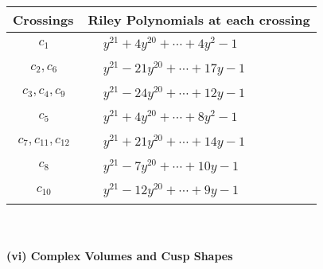\documentclass[1p]{elsarticle_modified}
\theoremstyle{definition}
\begin{document}
\begin{tabular}{m{50pt}|m{274pt}}
Crossings & \hspace{64pt}Riley Polynomials at each crossing \\
\hline $$\begin{aligned}c_{1}\end{aligned}$$&$\begin{aligned}
&y^{21}+4 y^{20}+\cdots+4 y^2-1
\end{aligned}$\\
\hline $$\begin{aligned}c_{2},c_{6}\end{aligned}$$&$\begin{aligned}
&y^{21}-21 y^{20}+\cdots+17 y-1
\end{aligned}$\\
\hline $$\begin{aligned}c_{3},c_{4},c_{9}\end{aligned}$$&$\begin{aligned}
&y^{21}-24 y^{20}+\cdots+12 y-1
\end{aligned}$\\
\hline $$\begin{aligned}c_{5}\end{aligned}$$&$\begin{aligned}
&y^{21}+4 y^{20}+\cdots+8 y^2-1
\end{aligned}$\\
\hline $$\begin{aligned}c_{7},c_{11},c_{12}\end{aligned}$$&$\begin{aligned}
&y^{21}+21 y^{20}+\cdots+14 y-1
\end{aligned}$\\
\hline $$\begin{aligned}c_{8}\end{aligned}$$&$\begin{aligned}
&y^{21}-7 y^{20}+\cdots+10 y-1
\end{aligned}$\\
\hline $$\begin{aligned}c_{10}\end{aligned}$$&$\begin{aligned}
&y^{21}-12 y^{20}+\cdots+9 y-1
\end{aligned}$\\
\hline
\end{tabular}\\~\\
\newpage\flushleft \textbf{(vi) Complex Volumes and Cusp Shapes}
\end{document}
